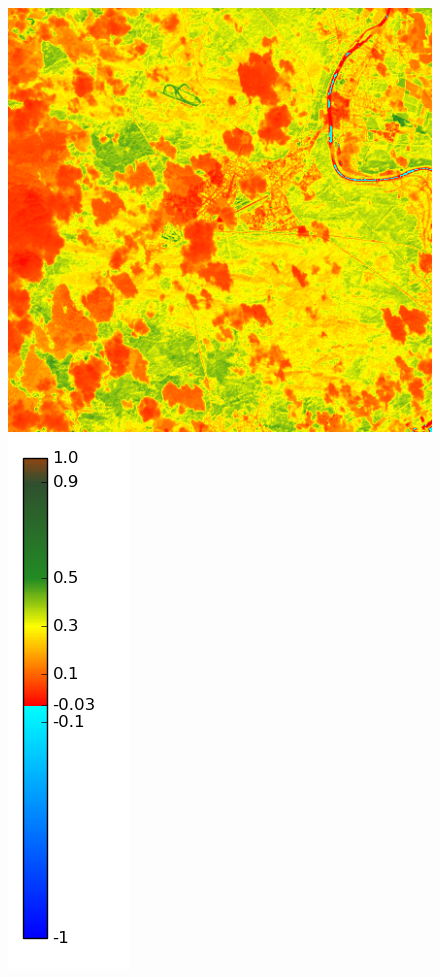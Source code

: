 \documentclass{book}
\begin{document}
\begin{figure}[H]
{\includegraphics[scale=0.25]{images/Fontainebleau/10_ndvi.png}
\includegraphics[scale=0.2]{images/colormap.png}
}
\end{figure}
\end{document}
